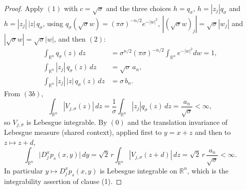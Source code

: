 \begin{proof}
Apply $(1)$ with $c = \sqrt\sigma$ and the three choices
$h = q_\sigma$, $h = |z_j|q_\sigma$ and $h = |z_j|\,|z|\,q_\sigma$, using
$q_\sigma(\sqrt\sigma w) = (\pi\sigma)^{-n/2}e^{-|w|^2}$,
$|(\sqrt\sigma w)_j| = \sqrt\sigma|w_j|$ and $|\sqrt\sigma w| = \sqrt\sigma|w|$,
and then $(2)$:
\begin{align}
  \int_{\mathbb{R}^n} q_\sigma(z)\,dz &= \sigma^{n/2}(\pi\sigma)^{-n/2}\!\!
     \int_{\mathbb{R}^n}\!\! e^{-|w|^2}dw = 1 , \tag{3a}\\
  \int_{\mathbb{R}^n} |z_j|\,q_\sigma(z)\,dz &= \sqrt\sigma\,a_n , \tag{3b}\\
  \int_{\mathbb{R}^n} |z_j|\,|z|\,q_\sigma(z)\,dz &= \sigma\,b_n . \tag{3c}
\end{align}
From $(3b)$,
\begin{equation*}
  \int_{\mathbb{R}^n}|V_{j,\sigma}(z)|\,dz
    = \frac1\sigma\int_{\mathbb{R}^n}|z_j|q_\sigma(z)\,dz
    = \frac{a_n}{\sqrt\sigma} < \infty , \tag{4}
\end{equation*}
so $V_{j,\sigma}$ is Lebesgue integrable.  By $(0)$ and the translation
invariance of Lebesgue measure (shared context), applied first to $y = x+z$ and
then to $z \mapsto z+d$,
\begin{equation*}
  \int_{\mathbb{R}^n}\bigl|D_j^xp_s(x,y)\bigr|\,dy
    = \sqrt2\,r\int_{\mathbb{R}^n}|V_{j,\sigma}(z+d)|\,dz
    = \sqrt2\,r\,\frac{a_n}{\sqrt\sigma} < \infty . \tag{5}
\end{equation*}
In particular $y \mapsto D_j^xp_s(x,y)$ is Lebesgue integrable on
$\mathbb{R}^n$, which is the integrability assertion of clause (1).


\end{proof}
